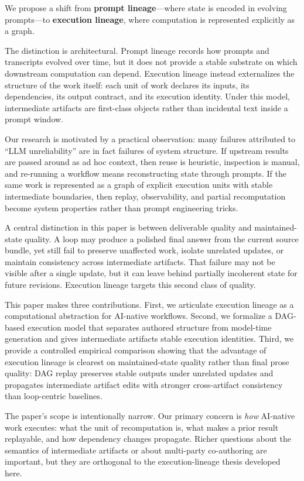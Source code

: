 \documentclass{article}
\begin{document}
We propose a shift from \textbf{prompt lineage}---where state is encoded in evolving prompts---to \textbf{execution lineage}, where computation is represented explicitly as a graph.

The distinction is architectural. Prompt lineage records how prompts and transcripts evolved over time, but it does not provide a stable substrate on which downstream computation can depend. Execution lineage instead externalizes the structure of the work itself: each unit of work declares its inputs, its dependencies, its output contract, and its execution identity. Under this model, intermediate artifacts are first-class objects rather than incidental text inside a prompt window.

Our research is motivated by a practical observation: many failures attributed to ``LLM unreliability'' are in fact failures of system structure. If upstream results are passed around as ad hoc context, then reuse is heuristic, inspection is manual, and re-running a workflow means reconstructing state through prompts. If the same work is represented as a graph of explicit execution units with stable intermediate boundaries, then replay, observability, and partial recomputation become system properties rather than prompt engineering tricks.

A central distinction in this paper is between deliverable quality and maintained-state quality. A loop may produce a polished final answer from the current source bundle, yet still fail to preserve unaffected work, isolate unrelated updates, or maintain consistency across intermediate artifacts. That failure may not be visible after a single update, but it can leave behind partially incoherent state for future revisions. Execution lineage targets this second class of quality.

This paper makes three contributions. First, we articulate execution lineage as a computational abstraction for AI-native workflows. Second, we formalize a DAG-based execution model that separates authored structure from model-time generation and gives intermediate artifacts stable execution identities. Third, we provide a controlled empirical comparison showing that the advantage of execution lineage is clearest on maintained-state quality rather than final prose quality: DAG replay preserves stable outputs under unrelated updates and propagates intermediate artifact edits with stronger cross-artifact consistency than loop-centric baselines.

The paper's scope is intentionally narrow. Our primary concern is \emph{how} AI-native work executes: what the unit of recomputation is, what makes a prior result replayable, and how dependency changes propagate. Richer questions about the semantics of intermediate artifacts or about multi-party co-authoring are important, but they are orthogonal to the execution-lineage thesis developed here.
\end{document}
